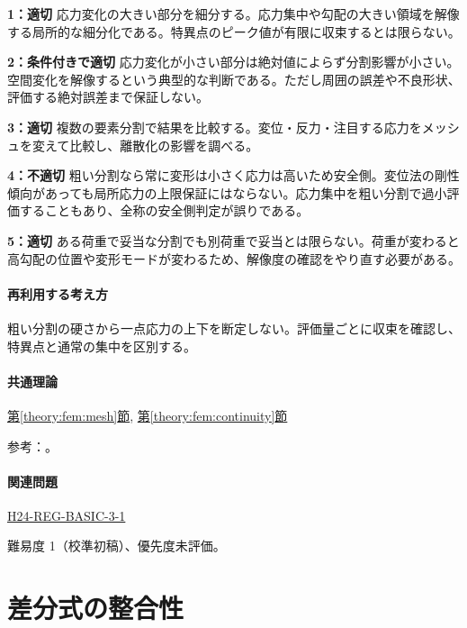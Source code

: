 \noindent\textbf{1：適切} 応力変化の大きい部分を細分する。応力集中や勾配の大きい領域を解像する局所的な細分化である。特異点のピーク値が有限に収束するとは限らない。\par

\noindent\textbf{2：条件付きで適切} 応力変化が小さい部分は絶対値によらず分割影響が小さい。空間変化を解像するという典型的な判断である。ただし周囲の誤差や不良形状、評価する絶対誤差まで保証しない。\par

\noindent\textbf{3：適切} 複数の要素分割で結果を比較する。変位・反力・注目する応力をメッシュを変えて比較し、離散化の影響を調べる。\par

\noindent\textbf{4：不適切} 粗い分割なら常に変形は小さく応力は高いため安全側。変位法の剛性傾向があっても局所応力の上限保証にはならない。応力集中を粗い分割で過小評価することもあり、全称の安全側判定が誤りである。\par

\noindent\textbf{5：適切} ある荷重で妥当な分割でも別荷重で妥当とは限らない。荷重が変わると高勾配の位置や変形モードが変わるため、解像度の確認をやり直す必要がある。\par

\paragraph{再利用する考え方} 粗い分割の硬さから一点応力の上下を断定しない。評価量ごとに収束を確認し、特異点と通常の集中を区別する。

\paragraph{共通理論} \hyperref[theory:fem:mesh]{第\ref*{theory:fem:mesh}節}, \hyperref[theory:fem:continuity]{第\ref*{theory:fem:continuity}節}

\par 参考：\cite{mit_roy_fea1999}。

\paragraph{関連問題} \hyperref[q:h24-reg-basic-3-1]{H24-REG-BASIC-3-1}

\par 難易度 1（校準初稿）、優先度未評価。

\section{差分式の整合性}

